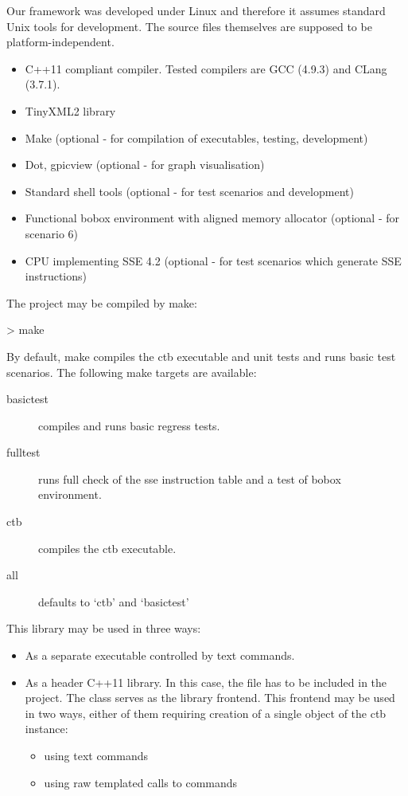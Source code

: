Our framework was developed under Linux and therefore it assumes standard Unix tools for development. The source files themselves are supposed to be platform-independent. 

\begin{itemize}
  \item C++11 compliant compiler. Tested compilers are GCC (4.9.3) and CLang (3.7.1).
  \item TinyXML2 library 
  \item Make (optional - for compilation of executables, testing, development)
  \item Dot, gpicview (optional - for graph visualisation)
  \item Standard shell tools (optional - for test scenarios and development) 
  \item Functional bobox environment with aligned memory allocator (optional - for scenario 6)
  \item CPU implementing SSE 4.2  (optional - for test scenarios which generate SSE instructions)
\end{itemize}

The project may be compiled by make:
\begin{code}
> make
\end{code}

By default, make compiles the ctb executable and unit tests and runs basic test scenarios. The following make targets are available:

\begin{description}
  \item[basictest] compiles and runs basic regress tests.
  \item[fulltest] runs full check of the sse instruction table and a test of bobox environment.
  \item[ctb] compiles the ctb executable.
  \item[all] defaults to `ctb' and `basictest'
\end{description}


This library may be used in three ways:
\begin{itemize}
  \item As a separate executable controlled by text commands.
  \item As a header C++11 library. In this case, the  file has to be included in the project. The  class serves as the library frontend. This frontend may be used in two ways, either of them requiring creation of a single object of the ctb instance:
  \begin{itemize}
    \item using text commands
    \item using raw templated calls to commands
  \end{itemize}
\end{itemize}

